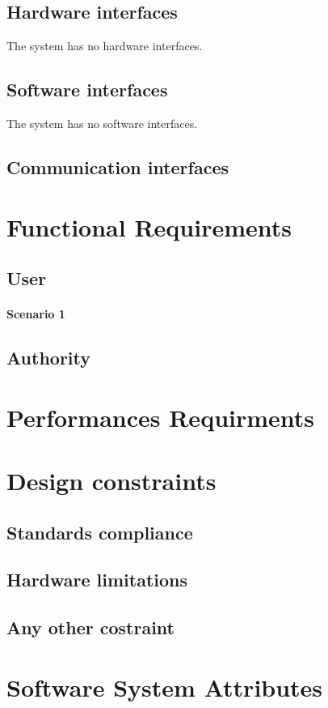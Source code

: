 \documentclass[12pt,a4paper]{report}
\begin{document}
		\subsection{Hardware interfaces}
	The system has no hardware interfaces.
		\subsection{Software interfaces}
	The system has no software interfaces.
		\subsection{Communication interfaces}
	\section{Functional Requirements}
		\subsection{User}
			\paragraph{Scenario 1}
	
		\subsection{Authority}
	\section{Performances Requirments}
	\section{Design constraints}
		\subsection{Standards compliance}
		\subsection{Hardware limitations}
		\subsection{Any other costraint}
	\section{Software System Attributes}
\end{document}
